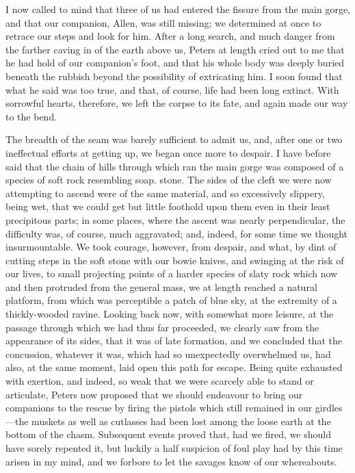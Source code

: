 I now called to mind that three of us had entered the fissure from the main
gorge, and that our companion, Allen, was still missing; we determined at once
to retrace our steps and look for him. After a long search, and much danger from
the farther caving in of the earth above us, Peters at length cried out to me
that he had hold of our companion's foot, and that his whole body was deeply
buried beneath the rubbish beyond the possibility of extricating him. I soon
found that what he said was too true, and that, of course, life had been long
extinct. With sorrowful hearts, therefore, we left the corpse to its fate, and
again made our way to the bend. 

The breadth of the seam was barely sufficient to admit us, and, after one or
two ineffectual efforts at getting up, we began once more to despair. I have
before said that the chain of hills through which ran the main gorge was
composed of a species of soft rock resembling soap. stone. The sides of the
cleft we were now attempting to ascend were of the same material, and so
excessively slippery, being wet, that we could get but little foothold upon them
even in their least precipitous parts; in some places, where the ascent was
nearly perpendicular, the difficulty was, of course, much aggravated; and,
indeed, for some time we thought insurmountable. We took courage, however, from
despair, and what, by dint of cutting steps in the soft stone with our bowie
knives, and swinging at the risk of our lives, to small projecting points of a
harder species of slaty rock which now and then protruded from the general mass,
we at length reached a natural platform, from which was perceptible a patch of
blue sky, at the extremity of a thickly-wooded ravine. Looking back now, with
somewhat more leisure, at the passage through which we had thus far proceeded,
we clearly saw from the appearance of its sides, that it was of late formation,
and we concluded that the concussion, whatever it was, which had so unexpectedly
overwhelmed us, had also, at the same moment, laid open this path for escape.
Being quite exhausted with exertion, and indeed, so weak that we were scarcely
able to stand or articulate, Peters now proposed that we should endeavour to
bring our companions to the rescue by firing the pistols which still remained in
our girdles---the muskets as well as cutlasses had been lost among the loose
earth at the bottom of the chasm. Subsequent events proved that, had we fired,
we should have sorely repented it, but luckily a half suspicion of foul play had
by this time arisen in my mind, and we forbore to let the savages know of our
whereabouts. 


